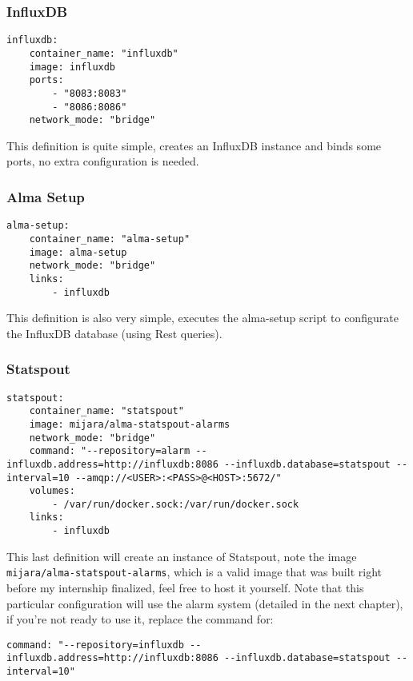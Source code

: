 \subsubsection{InfluxDB}

\begin{lstlisting}
influxdb:
    container_name: "influxdb"
    image: influxdb
    ports:
        - "8083:8083"
        - "8086:8086"
    network_mode: "bridge"
\end{lstlisting}

This definition is quite simple, creates an InfluxDB instance and binds some ports, no extra configuration is needed.

\subsubsection{Alma Setup}

\begin{lstlisting}
alma-setup:
    container_name: "alma-setup"
    image: alma-setup
    network_mode: "bridge"
    links:
        - influxdb
\end{lstlisting}

This definition is also very simple, executes the alma-setup script to configurate the InfluxDB database (using Rest queries).

\subsubsection{Statspout}

\begin{lstlisting}
statspout:
    container_name: "statspout"
    image: mijara/alma-statspout-alarms
    network_mode: "bridge"
    command: "--repository=alarm --influxdb.address=http://influxdb:8086 --influxdb.database=statspout --interval=10 --amqp://<USER>:<PASS>@<HOST>:5672/"
    volumes:
        - /var/run/docker.sock:/var/run/docker.sock
    links:
        - influxdb
\end{lstlisting}

This last definition will create an instance of Statspout, note the image \texttt{mijara/alma-statspout-alarms}, which is a valid image that was built right before my internship finalized, feel free to host it yourself. Note that this particular configuration will use the alarm system (detailed in the next chapter), if you're not ready to use it, replace the command for:

\begin{lstlisting}
command: "--repository=influxdb --influxdb.address=http://influxdb:8086 --influxdb.database=statspout --interval=10"
\end{lstlisting}

